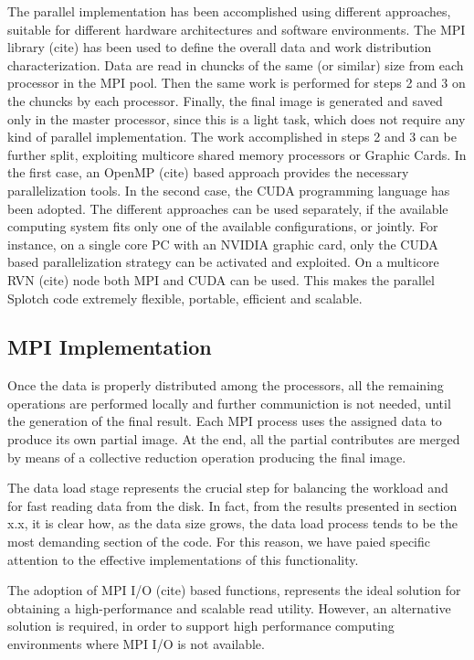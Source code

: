 The parallel implementation has been accomplished using different approaches, suitable 
for different hardware architectures and software environments. The MPI library (cite) 
has been used to define the overall data and work distribution characterization. Data are
read in chuncks of the same (or similar) size from each processor in the MPI pool. Then 
the same work is performed for steps 2 and 3 on the chuncks by each processor. Finally,
the final image is generated and saved only in the master processor, since this is a 
light task, which does not require any kind of parallel implementation. The work accomplished
in steps 2 and 3 can be further split, exploiting multicore shared memory processors or Graphic Cards.
In the first case, an OpenMP (cite) based approach provides the necessary parallelization tools. 
In the second case, the CUDA programming language has been adopted. The different approaches
can be used separately, if the available computing system fits only one of the available 
configurations, or jointly. For instance, on a single core PC with an NVIDIA graphic card, 
only the CUDA based parallelization strategy can be activated and exploited. On a multicore
RVN (cite) node both MPI and CUDA can be used. This makes the parallel Splotch code extremely 
flexible, portable, efficient and scalable.


\subsection{MPI Implementation}
\label{mpi}

Once the data is properly distributed among the processors, all the remaining operations 
are performed locally and further communiction is not needed, until the generation
of the final result. Each MPI process uses the assigned 
data to produce its own partial image. At the end, all the partial contributes are merged by means of a 
collective reduction operation producing the final image. 

The data load stage represents the crucial step for balancing the workload and for fast reading 
data from the disk. In fact, from the results presented in section x.x, it is clear how,
as the data size grows,
the data load process tends to be the most demanding section of the code. For this reason,
we have paied specific attention to the effective implementations of this functionality.

The adoption of MPI I/O (cite) based functions, represents the ideal solution for obtaining 
a high-performance and scalable read utility. However, an alternative solution is required, in
order to support high performance computing environments where MPI I/O is not available. 



